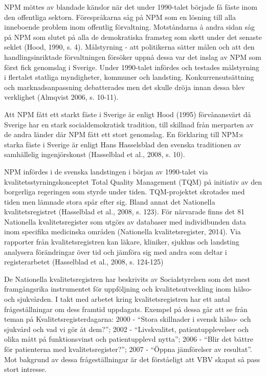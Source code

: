 NPM möttes av blandade känslor när det under 1990-talet började få fäste inom den offentliga sektorn. Förespråkarna såg på NPM som en lösning till alla inneboende problem inom offentlig förvaltning. Motståndarna å andra sidan såg på NPM som slutet på alla de demokratiska framsteg som skett under det senaste seklet (Hood, 1990, s. 4). Målstyrning - att politikerna sätter målen och att den handlingsinriktade förvaltningen försöker uppnå dessa var det inslag av NPM som först fick genomslag i Sverige. Under 1990-talet infördes och testades målstyrning i flertalet statliga myndigheter, kommuner och landsting. Konkurrensutsättning och marknadsanpassning debatterades men det skulle dröja innan dessa blev verklighet (Almqvist 2006, s. 10-11).
 
Att NPM fått ett starkt fäste i Sverige är enligt Hood (1995) förvånansvärt då
Sverige har en stark socialdemokratisk tradition, till skillnad från merparten av de andra länder där NPM fått ett stort genomslag. En förklaring till NPM:s starka fäste i Sverige är enligt Hans Hasselsblad den svenska traditionen av samhällelig ingenjörskonst (Hasselblad et al., 2008, s. 10).
 
NPM infördes i de svenska landstingen i början av 1990-talet via kvalitetsstyrningskonceptet Total Quality Management (TQM) på initiativ av den borgerliga regeringen som styrde under tiden. TQM-projektet skrotades med tiden men lämnade stora spår efter sig. Bland annat det Nationella kvalitetsregistret (Hasselblad et al., 2008, s. 123). För närvarade finns det 81 Nationella kvalitetsregister som utgörs av databaser med individbunden data inom specifika medicinska områden (Nationella kvalitetsregister, 2014). Via rapporter från kvalitetsregistren kan läkare, kliniker, sjukhus och landsting analysera förändringar över tid och jämföra sig med andra som deltar i registerarbetet (Hasselblad et al., 2008, s. 124-125)

De Nationella kvalitetsregistren har beskrivits av Socialstyrelsen som det mest framgångsrika instrumentet för uppföljning och kvalitetsutveckling inom hälso- och sjukvården. I takt med arbetet kring kvalitetsregistren har ett antal frågeställningar om dess framtid uppdagats. Exempel på dessa går att se från teman på Kvalitetsregisterdagarna: 2000 - “Stora skillnader i svensk hälso- och sjukvård och vad vi gör åt dem?”; 2002 - “Livskvalitet, patientupplevelser och olika mått på funktionsvinst och patientupplevd nytta”; 2006 - “Blir det bättre för patienterna med kvalitetsregister?”; 2007 - “Öppna jämförelser av resultat”. Mot bakgrund av dessa frågeställningar är det förståeligt att VBV skapat så pass stort intresse. 

